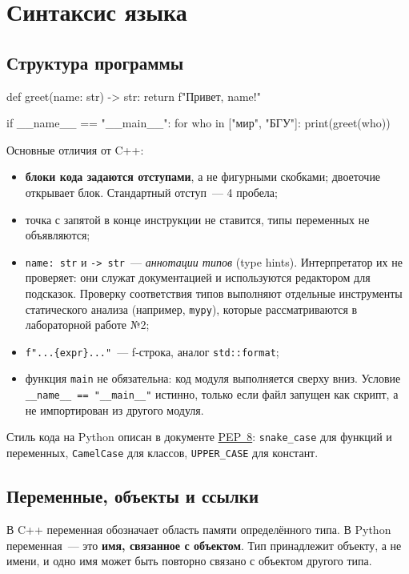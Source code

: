 \documentclass[11pt,a4paper]{article}
\newcommand{\code}[1]{\texttt{#1}}
\begin{document}
\section{Синтаксис языка}

\subsection{Структура программы}

\begin{py}
def greet(name: str) -> str:
    return f"Привет, {name}!"


if __name__ == "__main__":
    for who in ["мир", "БГУ"]:
        print(greet(who))
\end{py}

Основные отличия от C++:
\begin{itemize}
  \item \textbf{блоки кода задаются отступами}, а не фигурными скобками; двоеточие открывает блок.
        Стандартный отступ~— 4 пробела;
  \item точка с запятой в конце инструкции не ставится, типы переменных не объявляются;
  \item \code{name: str} и \code{-> str}~— \emph{аннотации типов} (type hints). Интерпретатор
        их не проверяет: они служат документацией и используются редактором для подсказок.
        Проверку соответствия типов выполняют отдельные инструменты статического анализа
        (например, \code{mypy}), которые рассматриваются в лабораторной работе №2;
  \item \code{f"...\{expr\}..."}~— f-строка, аналог \code{std::format};
  \item функция \code{main} не обязательна: код модуля выполняется сверху вниз. Условие
        \code{\_\_name\_\_ == "\_\_main\_\_"} истинно, только если файл запущен как скрипт,
        а не импортирован из другого модуля.
\end{itemize}

Стиль кода на Python описан в документе \href{https://peps.python.org/pep-0008/}{PEP~8}:
\code{snake\_case} для функций и переменных, \code{CamelCase} для классов, \code{UPPER\_CASE}
для констант.

\subsection{Переменные, объекты и ссылки}

В C++ переменная обозначает область памяти определённого типа. В Python переменная~— это
\textbf{имя, связанное с объектом}. Тип принадлежит объекту, а не имени, и одно имя может быть
повторно связано с объектом другого типа.
\end{document}
